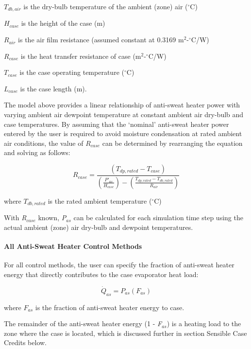 \({T_{db,air}}\) is the dry-bulb temperature of the ambient (zone) air (\(^{\circ}\)C)

\({H_{case}}\) is the height of the case (m)

\({R_{air}}\) is the air film resistance (assumed constant at 0.3169 m\(^{2}\)-\(^{\circ}\)C/W)

\({R_{case}}\) is the heat transfer resistance of case (m\(^{2}\)-\(^{\circ}\)C/W)

\({T_{case}}\) is the case operating temperature (\(^{\circ}\)C)

\({L_{case}}\) is the case length (m).

The model above provides a linear relationship of anti-sweat heater power with varying ambient air dewpoint temperature at constant ambient air dry-bulb and case temperatures. By assuming that the `nominal' anti-sweat heater power entered by the user is required to avoid moisture condensation at rated ambient air conditions, the value of \({R_{case}}\) can be determined by rearranging the equation and solving as follows:

\begin{equation}
{R_{case}} = \frac{{\left( {{T_{dp,rated}} - {T_{case}}} \right)}}{{\left( {\frac{{{P'}_{as}}}{{{H_{case}}}}} \right) - \left( {\frac{{{T_{dp,rated}} - {T_{db,rated}}}}{{{R_{air}}}}} \right)}}
\end{equation}

where \({T_{db,rated}}\) is the rated ambient temperature (\(^{\circ}\)C)

With \emph{R\(_{case}\)} known, \emph{P\(_{as}\)} can be calculated for each simulation time step using the actual ambient (zone) air dry-bulb and dewpoint temperatures.

\paragraph{All Anti-Sweat Heater Control Methods}\label{all-anti-sweat-heater-control-methods}

For all control methods, the user can specify the fraction of anti-sweat heater energy that directly contributes to the case evaporator heat load:

\begin{equation}
{\dot Q_{as}} = {P_{as}}\left( {{F_{as}}} \right)
\end{equation}

where \({F_{as}}\) is the fraction of anti-sweat heater energy to case.

The remainder of the anti-sweat heater energy (1 - \emph{F\(_{as}\)}) is a heating load to the zone where the case is located, which is discussed further in section Sensible Case Credits below.

